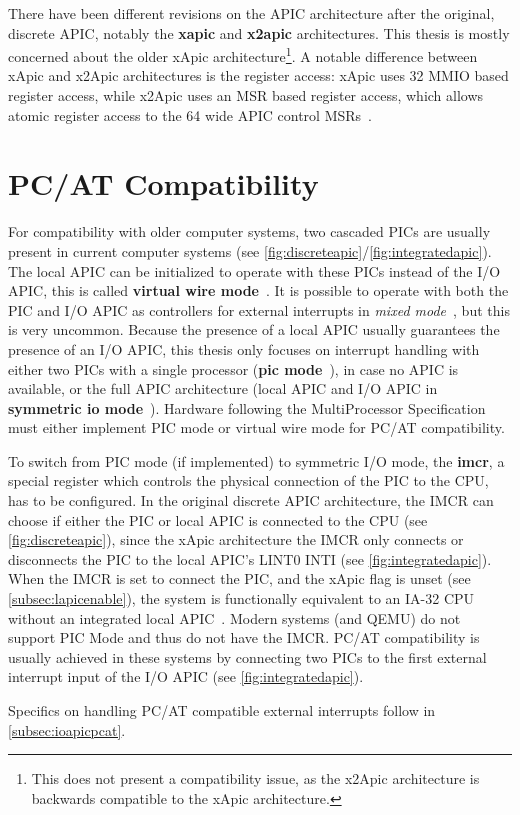 There have been different revisions on the APIC architecture after the original, discrete APIC, notably the \textbf{\gls{xapic}} and \textbf{\gls{x2apic}} architectures.
This thesis is mostly concerned about the older xApic architecture\footnote{
  This does not present a compatibility issue, as the x2Apic architecture is backwards compatible to the xApic architecture.}.
A notable difference between xApic and x2Apic architectures is the register access: xApic uses \SI{32}{\bit} MMIO based register access, while x2Apic uses an MSR based register access, which allows atomic register access to the \SI{64}{\bit} wide APIC control MSRs~\autocite[sec.~3.11.12]{ia32}.

\section{PC/AT Compatibility}
\label{sec:pcatcompat}

For compatibility with older computer systems, two cascaded PICs are usually present in current computer systems (see \autoref{fig:discreteapic}/\autoref{fig:integratedapic}).
The local APIC can be initialized to operate with these PICs instead of the I/O APIC, this is called \textbf{\gls{virtual wire mode}}~\autocite[sec.~3.6.2.2]{mpspec}.
It is possible to operate with both the PIC and I/O APIC as controllers for external interrupts in \textit{mixed mode}~\autocite[sec.~3.6.2.3]{mpspec}, but this is very uncommon.
Because the presence of a local APIC usually guarantees the presence of an I/O APIC, this thesis only focuses on interrupt handling with either two PICs with a single processor (\textbf{\gls{pic mode}}~\autocite[sec.~3.6.2.1]{mpspec}), in case no APIC is available, or the full APIC architecture (local APIC and I/O APIC in \textbf{\gls{symmetric io mode}}~\cite[sec.~3.6.2.3]{mpspec}).
Hardware following the MultiProcessor Specification must either implement PIC mode or virtual wire mode for PC/AT compatibility.

To switch from PIC mode (if implemented) to symmetric I/O mode, the \textbf{\gls{imcr}}, a special register which controls the physical connection of the PIC to the CPU, has to be configured.
In the original discrete APIC architecture, the IMCR can choose if either the PIC or local APIC is connected to the CPU (see \autoref{fig:discreteapic}), since the xApic architecture the IMCR only connects or disconnects the PIC to the local APIC's LINT0 INTI (see \autoref{fig:integratedapic}).
When the IMCR is set to connect the PIC, and the xApic  flag is unset (see \autoref{subsec:lapicenable}), the system is functionally equivalent to an IA-32 CPU without an integrated local APIC~\autocite[sec.~3.11.4.3]{ia32}.
Modern systems (and QEMU) do not support PIC Mode and thus do not have the IMCR\@.
PC/AT compatibility is usually achieved in these systems by connecting two PICs to the first external interrupt input of the I/O APIC (see \autoref{fig:integratedapic}).

Specifics on handling PC/AT compatible external interrupts follow in \autoref{subsec:ioapicpcat}.

\cleardoublepage